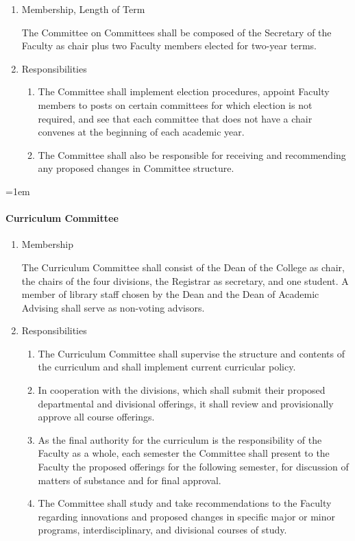 \documentclass{manual}
\let\oldparagraph\paragraph
\renewcommand\paragraph{\leftskip=1em\oldparagraph}
\newcommand{\itemLevelA}{\alph*.}
\newcommand{\itemLevelB}{\arabic*)}
\newcommand{\itemRefA}{\alph*}
\newcommand{\itemRefB}{\arabic*}
\begin{document}
	\begin{enumerate}[label=\itemLevelA,ref=\itemRefA]
	\item Membership, Length of Term

		The Committee on Committees shall be composed of the Secretary of the Faculty as chair plus two Faculty members elected for two-year terms.

	\item Responsibilities

		\begin{enumerate}[label=\itemLevelB,ref=\itemRefB]
		\item The Committee shall implement election procedures, appoint Faculty members to posts on certain committees for which election is not required, and see that each committee that does not have a chair convenes at the beginning of each academic year.
		\item The Committee shall also be responsible for receiving and recommending any proposed changes in Committee structure.
		\end{enumerate}
	
	\end{enumerate}

\paragraph{Curriculum Committee}

	\begin{enumerate}[label=\itemLevelA,ref=\itemRefA]
	\item Membership

		The Curriculum Committee shall consist of the Dean of the College as chair, the chairs of the four divisions, the Registrar as secretary, and one student. A member of library staff chosen by the Dean and the Dean of Academic Advising shall serve as non-voting advisors.

	\item Responsibilities

		\begin{enumerate}[label=\itemLevelB,ref=\itemRefB]
		\item The Curriculum Committee shall supervise the structure and contents of the curriculum and shall implement current curricular policy.
		\item In cooperation with the divisions, which shall submit their proposed departmental and divisional offerings, it shall review and provisionally approve all course offerings.
		\item As the final authority for the curriculum is the responsibility of the Faculty as a whole, each semester the Committee shall present to the Faculty the proposed offerings for the following semester, for discussion of matters of substance and for final approval.
		\item The Committee shall study and take recommendations to the Faculty regarding innovations and proposed changes in specific major or minor programs, interdisciplinary, and divisional courses of study.
		\end{enumerate}
	
	\end{enumerate}
\end{document}
